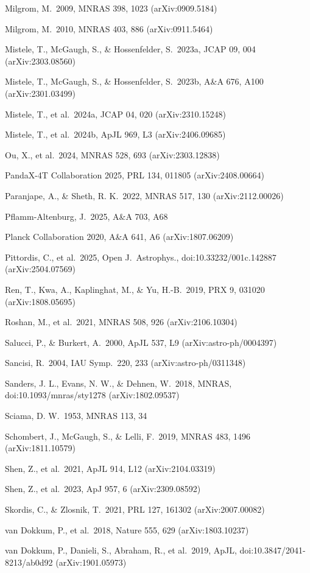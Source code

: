 \documentclass[
  10pt,
]{article}
\begin{document}
{\begin{list}{}{\setlength{\leftmargin}{1.5em}\setlength{\itemindent}{-1.5em}\setlength{\itemsep}{1pt}\setlength{\parsep}{0pt}}
\item Milgrom, M.\ 2009, MNRAS 398, 1023 (arXiv:0909.5184)
\item Milgrom, M.\ 2010, MNRAS 403, 886 (arXiv:0911.5464)
\item Mistele, T., McGaugh, S., \& Hossenfelder, S.\ 2023a, JCAP 09, 004 (arXiv:2303.08560)
\item Mistele, T., McGaugh, S., \& Hossenfelder, S.\ 2023b, A\&A 676, A100 (arXiv:2301.03499)
\item Mistele, T., et al.\ 2024a, JCAP 04, 020 (arXiv:2310.15248)
\item Mistele, T., et al.\ 2024b, ApJL 969, L3 (arXiv:2406.09685)
\item Ou, X., et al.\ 2024, MNRAS 528, 693 (arXiv:2303.12838)
\item PandaX-4T Collaboration 2025, PRL 134, 011805 (arXiv:2408.00664)
\item Paranjape, A., \& Sheth, R. K.\ 2022, MNRAS 517, 130 (arXiv:2112.00026)
\item Pflamm-Altenburg, J.\ 2025, A\&A 703, A68
\item Planck Collaboration 2020, A\&A 641, A6 (arXiv:1807.06209)
\item Pittordis, C., et al.\ 2025, Open J.\ Astrophys., doi:10.33232/001c.142887 (arXiv:2504.07569)
\item Ren, T., Kwa, A., Kaplinghat, M., \& Yu, H.-B.\ 2019, PRX 9, 031020 (arXiv:1808.05695)
\item Roshan, M., et al.\ 2021, MNRAS 508, 926 (arXiv:2106.10304)
\item Salucci, P., \& Burkert, A.\ 2000, ApJL 537, L9 (arXiv:astro-ph/0004397)
\item Sancisi, R.\ 2004, IAU Symp.\ 220, 233 (arXiv:astro-ph/0311348)
\item Sanders, J. L., Evans, N. W., \& Dehnen, W.\ 2018, MNRAS, doi:10.1093/mnras/sty1278 (arXiv:1802.09537)
\item Sciama, D. W.\ 1953, MNRAS 113, 34
\item Schombert, J., McGaugh, S., \& Lelli, F.\ 2019, MNRAS 483, 1496 (arXiv:1811.10579)
\item Shen, Z., et al.\ 2021, ApJL 914, L12 (arXiv:2104.03319)
\item Shen, Z., et al.\ 2023, ApJ 957, 6 (arXiv:2309.08592)
\item Skordis, C., \& Zlosnik, T.\ 2021, PRL 127, 161302 (arXiv:2007.00082)
\item van Dokkum, P., et al.\ 2018, Nature 555, 629 (arXiv:1803.10237)
\item van Dokkum, P., Danieli, S., Abraham, R., et al.\ 2019, ApJL, doi:10.3847/2041-8213/ab0d92 (arXiv:1901.05973)

\end{list}}
\end{document}
